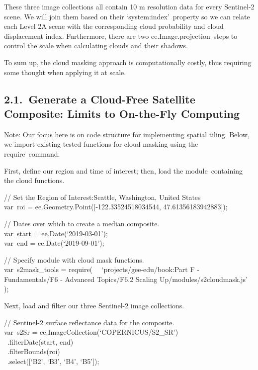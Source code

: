 \documentclass[
  letterpaper,
  DIV=11,
  numbers=noendperiod]{scrreprt}
\begin{document}
These three image collections all contain 10 m resolution data for every
Sentinel-2 scene. We will join them based on their
`system:index'~property so we can relate each Level 2A scene with the
corresponding cloud probability and cloud displacement index.
Furthermore, there are two ee.Image.projection~steps to control the
scale when calculating clouds and their shadows.

To sum up, the cloud masking approach is computationally costly, thus
requiring some thought when applying it at scale.

\hypertarget{generate-a-cloud-free-satellite-composite-limits-to-on-the-fly-computing}{%
\subsection{2.1.~Generate a Cloud-Free Satellite Composite: Limits to
On-the-Fly
Computing}\label{generate-a-cloud-free-satellite-composite-limits-to-on-the-fly-computing}}

Note: Our focus here is on code structure for implementing spatial
tiling. Below, we import existing tested functions for cloud masking
using the require~command.

First, define our region and time of interest; then, load the
module~containing the cloud functions.

// Set the Region of Interest:Seattle, Washington, United States\\
var~roi = ee.Geometry.Point({[}-122.33524518034544,
47.61356183942883{]});

// Dates over which to create a median composite.\\
var~start = ee.Date(`2019-03-01');\\
var~end = ee.Date(`2019-09-01');

// Specify module with cloud mask functions.\\
var~s2mask\_tools = require(~ ~`projects/gee-edu/book:Part F -
Fundamentals/F6 - Advanced Topics/F6.2 Scaling
Up/modules/s2cloudmask.js'\\
);

Next, load and filter our three Sentinel-2 image collections.

// Sentinel-2 surface reflectance data for the composite.\\
var~s2Sr = ee.ImageCollection(`COPERNICUS/S2\_SR')\\
\hspace*{0.333em} ~.filterDate(start, end)\\
\hspace*{0.333em} ~.filterBounds(roi)\\
\hspace*{0.333em} ~.select({[}`B2', `B3', `B4', `B5'{]});
\end{document}
